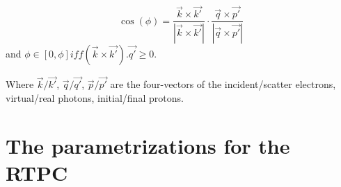 \begin{equation}
  \cos(\phi) = \frac{\vec{k} \times \vec{k'}}{| \vec{k} \times \vec{k'} |} 
   \cdot \frac{\vec{q} \times \vec{p'}}{| \vec{q} \times \vec{p'} |}
\end{equation}
and $\phi \in [0,\phi] iff (\vec{k} \times \vec{k'}).\vec{q'} \geq 0$.

Where $\vec{k}/\vec{k'}$, $\vec{q}/\vec{q'}$, $\vec{p}/\vec{p'}$ are the 
four-vectors of the incident/scatter electrons, virtual/real photons, 
initial/final protons. 

\normalsize



\chapter{The parametrizations for the RTPC} \label{app:RTPC_appendix}
